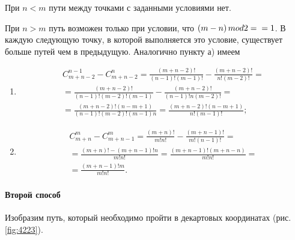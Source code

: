 \documentclass{book}
\begin{document}
При $n < m$ пути между точками с заданными условиями нет.

При $n > m$ путь возможен только при условии, что $ \left( m-n \right) mod 2 = \\ = 1$.
В каждую следующую точку, в которой выполняется это условие, существует больше путей чем в предыдущую.
Аналогично пункту а) имеем

\begin{enumerate}[label=(\roman*)]
\item
\begin{equation*}
\begin{split}
C_{m+n-2}^{n-1} - C_{m+n-2}^n =
\frac{ \left( m+n-2 \right)!}{ \left( n-1 \right)! \left( m-1 \right)!} -
\frac{ \left( m+n-2 \right)!}{n! \left( m-2 \right)!} = \\
= \frac{ \left( m+n-2 \right)!}{ \left( n-1 \right)! \left( m-2 \right)! \left( m-1 \right)} -
\frac{ \left( m+n-2 \right)!}{ \left( n-1 \right)!n \left( m-2 \right)!}= \\
= \frac{ \left( m+n-2 \right)! \left( n-m+1 \right) }{\left( n-1 \right)! \left( m-2 \right)! \left( m-1 \right) n} =
\frac{ \left( m+n-2 \right)! \left( n-m+1 \right) }{n! \left( m-1 \right)!};
\end{split}
\end{equation*}
\item 
\begin{equation*}
\begin{split}
C_{m+n}^m - C_{m+n-1}^m =
\frac{ \left( m+n \right)!}{m! n!} - \frac{ \left( m+n-1 \right)!}{m! \left( n-1 \right)!} = \\
= \frac{ \left( m+n \right)! - \left( m+n-1 \right)!n}{m!n!} =
\frac{ \left( m+n-1 \right)! \left( m+n-n \right) }{m!n!} = \\
= \frac{ \left( m+n-1 \right)! m}{m!n!}.
\end{split}
\end{equation*}
\end{enumerate}

\paragraph*{Второй способ}

Изобразим путь, который необходимо пройти в декартовых координатах (рис. \ref{fig:4223}).
\end{document}
